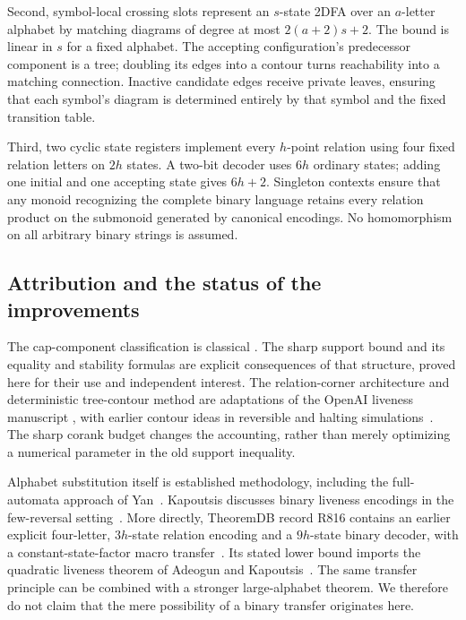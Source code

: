 Second, symbol-local crossing slots represent an $s$-state 2DFA
over an $a$-letter alphabet by matching diagrams of degree at most
$2(a+2)s+2$. The bound is linear in $s$ for a fixed alphabet.
The accepting configuration's predecessor component is a tree;
doubling its edges into a contour turns reachability into a
matching connection. Inactive candidate edges receive private
leaves, ensuring that each symbol's diagram is determined entirely
by that symbol and the fixed transition table.

Third, two cyclic state registers implement every $h$-point relation
using four fixed relation letters on $2h$ states. A two-bit decoder
uses $6h$ ordinary states; adding one initial and one accepting state
gives $6h+2$. Singleton contexts ensure that any monoid recognizing
the complete binary language retains every relation product on the
submonoid generated by canonical encodings. No homomorphism on
all arbitrary binary strings is assumed.

\subsection{Attribution and the status of the improvements}

The cap-component classification is classical
\cite{Dolinka2015}. The sharp support bound and its equality and
stability formulas are explicit consequences of that structure,
proved here for their use and independent interest. The
relation-corner architecture and deterministic tree-contour method
are adaptations of the OpenAI liveness manuscript
\cite{OpenAILiveness2026}, with earlier contour ideas in reversible
and halting simulations~\cite{SipserHalting1980,LangeMcKenzieTapp2000}.
The sharp corank budget changes the accounting, rather than merely
optimizing a numerical parameter in the old support inequality.

Alphabet substitution itself is established methodology, including
the full-automata approach of Yan~\cite{Yan2008}.
Kapoutsis discusses binary liveness encodings in the few-reversal
setting~\cite[Section~8]{Kapoutsis2013}. More directly,
TheoremDB record R816 contains an earlier explicit four-letter,
$3h$-state relation encoding and a $9h$-state binary decoder,
with a constant-state-factor macro transfer~\cite{TheoremDBR816}.
Its stated lower bound imports the quadratic liveness theorem of
Adeogun and Kapoutsis~\cite{AdeogunKapoutsis2026}.
The same transfer principle can be combined with a stronger
large-alphabet theorem. We therefore do not claim that
the mere possibility of a binary transfer originates here.

